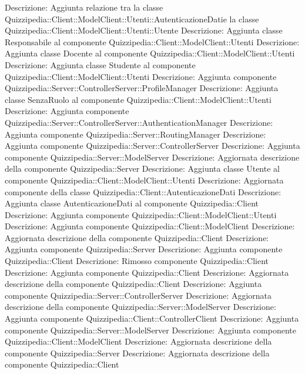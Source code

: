 Descrizione: Aggiunta relazione tra la classe Quizzipedia::Client::ModelClient::Utenti::AutenticazioneDatie la classe Quizzipedia::Client::ModelClient::Utenti::Utente 
Descrizione: Aggiunta classe Responsabile al componente Quizzipedia::Client::ModelClient::Utenti 
Descrizione: Aggiunta classe Docente al componente Quizzipedia::Client::ModelClient::Utenti 
Descrizione: Aggiunta classe Studente al componente Quizzipedia::Client::ModelClient::Utenti 
Descrizione: Aggiunta componente Quizzipedia::Server::ControllerServer::ProfileManager 
Descrizione: Aggiunta classe SenzaRuolo al componente Quizzipedia::Client::ModelClient::Utenti 
Descrizione: Aggiunta componente Quizzipedia::Server::ControllerServer::AuthenticationManager 
Descrizione: Aggiunta componente Quizzipedia::Server::RoutingManager 
Descrizione: Aggiunta componente Quizzipedia::Server::ControllerServer 
Descrizione: Aggiunta componente Quizzipedia::Server::ModelServer 
Descrizione: Aggiornata descrizione della componente Quizzipedia::Server 
Descrizione: Aggiunta classe Utente al componente Quizzipedia::Client::ModelClient::Utenti 
Descrizione: Aggiornata componente della classe Quizzipedia::Client::AutenticazioneDati 
Descrizione: Aggiunta classe AutenticazioneDati al componente Quizzipedia::Client 
Descrizione: Aggiunta componente Quizzipedia::Client::ModelClient::Utenti 
Descrizione: Aggiunta componente Quizzipedia::Client::ModelClient 
Descrizione: Aggiornata descrizione della componente Quizzipedia::Client 
Descrizione: Aggiunta componente Quizzipedia::Server 
Descrizione: Aggiunta componente Quizzipedia::Client 
Descrizione: Rimosso componente Quizzipedia::Client 
Descrizione: Aggiunta componente Quizzipedia::Client 
Descrizione: Aggiornata descrizione della componente Quizzipedia::Client 
Descrizione: Aggiunta componente Quizzipedia::Server::ControllerServer 
Descrizione: Aggiornata descrizione della componente Quizzipedia::Server::ModelServer 
Descrizione: Aggiunta componente Quizzipedia::Client::ControllerClient 
Descrizione: Aggiunta componente Quizzipedia::Server::ModelServer 
Descrizione: Aggiunta componente Quizzipedia::Client::ModelClient 
Descrizione: Aggiornata descrizione della componente Quizzipedia::Server 
Descrizione: Aggiornata descrizione della componente Quizzipedia::Client 
